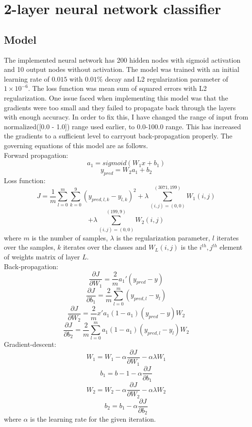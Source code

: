 \documentclass[10pt, a4paper, twocolumn]{article}
\begin{document}
\section{2-layer neural network classifier}
\subsection{Model}
The implemented neural network has 200 hidden nodes with sigmoid activation and 10 output nodes without activation. The model was trained with an initial learning rate of $0.015$ with $0.01\%$ decay and L2 regularization parameter of $1 \times 10^{-6}$. The loss function was mean sum of squared errors with L2 regularization. One issue faced when implementing this model was that the gradients were too small and they failed to propagate back through the layers with enough accuracy. In order to fix this, I have changed the range of input from normalized([0.0 - 1.0]) range used earlier, to 0.0-100.0 range. This has increased the gradients to a sufficient level to carryout back-propagation properly. The governing equations of this model are as follows.\\
Forward propagation: {\small
\[a_{1} = sigmoid(W_{1} x + b_{1})\]
\[y_{pred} = W_{2} a_{1} + b_{2}\]}
Loss function: {\small \[J = \frac{1}{m}\sum_{l=0}^{m}\sum_{k=0}^{9}(y_{pred,l,k}-y_{l,k})^{2} + \lambda\sum_{(i,j) = (0,0)}^{(3071,199)} W_{1}(i,j)\]
\[ + \lambda\sum_{(i,j) = (0,0)}^{(199,9)} W_{2}(i,j)\]} where $m$ is the number of samples, $\lambda$ is the regularization parameter, $l$ iterates over the samples, $k$ iterates over the classes and $W_{L}(i,j)$ is the $i^{th},j^{th}$ element of weights matrix of layer $L$.\\
Back-propagation:{\small 
\[\frac{\partial J}{\partial W_{1}} = \frac{2}{m}a_{1}'(y_{pred}-y)\]
\[\frac{\partial J}{\partial b_{1}} = \frac{2}{m}\sum_{l=0}^{m}(y_{pred,l}-y_{l})\]
\[\frac{\partial J}{\partial W_{2}} = \frac{2}{m} x' a_{1} (1-a_{1})(y_{pred}-y)W_{2}\]
\[\frac{\partial J}{\partial b_{2}} = \frac{2}{m}\sum_{l=0}^{m} a_{1} (1-a_{1}) (y_{pred,l}-y_{l})W_{2}\]}
Gradient-descent:{\small 
\[W_{1} = W_{1} - \alpha \frac{\partial J}{\partial W_{1}} - \alpha \lambda W_{1}\]
\[b_{1} = b-{1} - \alpha \frac{\partial J}{\partial b_{1}}\]
\[W_{2} = W_{2} - \alpha \frac{\partial J}{\partial W_{2}} - \alpha \lambda W_{2}\]
\[b_{2} = b_{1} - \alpha \frac{\partial J}{\partial b_{2}}\]} where $\alpha$ is the learning rate for the given iteration.
\end{document}

